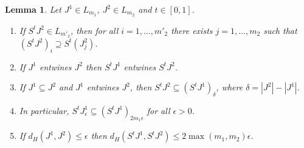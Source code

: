 \documentclass[11pt]{article}
\newtheorem{lemma}[thm]{Lemma}
\theoremstyle{definition}
\theoremstyle{proof}
\DeclareMathOperator{\+}{\mathop{\tilde{+}}}
\newcommand{\J}{L}
\newcommand{\eps}{\epsilon}
\numberwithin{equation}{section}
\numberwithin{equation}{section}
\begin{document}
\begin{lemma} \label{lem:StHausdorff}
Let $J^1 \in \J_{m_1}$, $J^2 \in \J_{m_2}$ and $t \in [0,1]$. 
\begin{enumerate}
\item If $S^t J^2 \in \J_{m'_2}$, then for all $i=1,\ldots,m'_2$ there exists $j=1,\ldots,m_2$ such that $(S^t J^2)_i \supseteq S^t(J^2_j)$. 
\item If $J^1$ entwines $J^2$ then $S^t J^1$ entwines $S^t J^2$. 
\item If $J^1 \subseteq J^2$ and $J^1$ entwines $J^2$, then $S^t J^2 \subseteq  (S^t J^1)_\delta$, where $\delta = |J^2|-|J^1|$.
\item In particular, $S^t J^1_\eps \subseteq (S^t J^1)_{2 m_1 \eps}$ for all $\eps > 0$.
\item If $d_H(J^1,J^2) \leq \eps$ then $d_H(S^t J^1,S^t J^2) \leq 2 \max(m_1,m_2) \eps$.
\end{enumerate}
\end{lemma}
\end{document}
